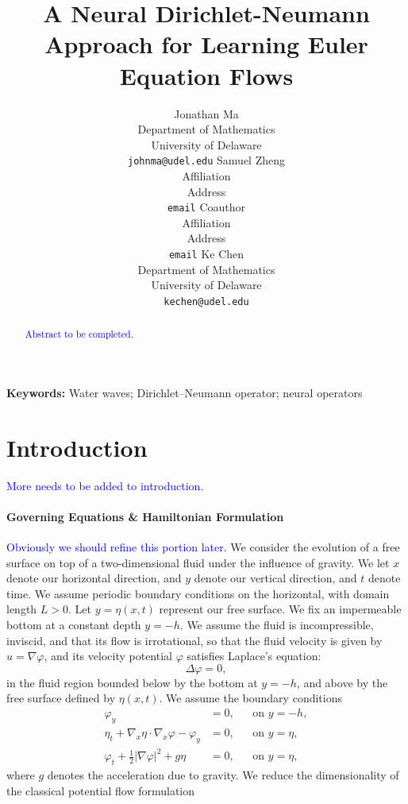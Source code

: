\documentclass{article}
\title{A Neural Dirichlet-Neumann Approach for Learning Euler Equation Flows}
\author{
  Jonathan Ma\\
  Department of Mathematics\\
  University of Delaware\\
  \texttt{johnma@udel.edu}
  \AND
  Samuel Zheng\\
  Affiliation\\
  Address\\
  \texttt{email}
  \And
  Coauthor\\
  Affiliation\\
  Address\\
  \texttt{email}
  \And
  Ke Chen\\
  Department of Mathematics\\
  University of Delaware\\
  \texttt{kechen@udel.edu}
}
\date{}
\providecommand{\keywords}[1]{\par\smallskip\noindent\textbf{Keywords:} #1}
\begin{document}
\maketitle
\thispagestyle{empty}

\begin{abstract}
\textcolor{blue}{Abstract to be completed.}
\end{abstract}
\keywords{Water waves; Dirichlet--Neumann operator; neural operators}

\section{Introduction}
\label{sec:intro}
\textcolor{blue}{More needs to be added to introduction.}

\paragraph{Governing Equations \& Hamiltonian Formulation}
\textcolor{blue}{Obviously we should refine this portion later.}
We consider the evolution of a free surface on top of a two-dimensional fluid
under the influence of gravity. We let $x$ denote our horizontal direction,
and $y$ denote our vertical direction, and $t$ denote time. We assume periodic
boundary conditions on the horizontal, with domain length $L>0$.
Let $y=\eta(x,t)$ represent our free surface. We fix an impermeable bottom
at a constant depth $y=-h$. We assume the fluid is incompressible, inviscid,
and that its flow is irrotational, so that the fluid velocity is given by
$u=\nabla\varphi$, and its velocity potential $\varphi$ satisfies Laplace's
equation:
\begin{equation}
    \Delta\varphi=0,
\end{equation}
in the fluid region bounded below by the bottom at $y=-h$, and above by the
free surface defined by $\eta(x,t)$. We assume the boundary conditions
\begin{equation}
\begin{aligned}
    \varphi_y &= 0, &&\text{on }y=-h,\\
    \eta_t+\nabla_x\eta\cdot\nabla_x\varphi-\varphi_y &= 0,
      &&\text{on }y=\eta,\\
    \varphi_t+\frac12|\nabla\varphi|^2+g\eta &= 0,
      &&\text{on }y=\eta,
\end{aligned}
\label{eq:euler-system}
\end{equation}
where $g$ denotes the acceleration due to gravity.
We reduce the dimensionality of the classical potential flow formulation
\end{document}
